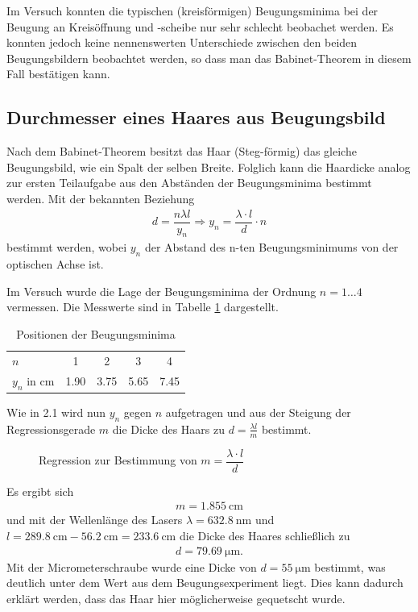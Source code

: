\documentclass[ngerman, parskip*]{scrartcl}
\begin{document}
Im Versuch konnten die typischen (kreisförmigen) Beugungsminima bei der Beugung an Kreisöffnung und -scheibe nur sehr schlecht beobachet werden. Es konnten jedoch keine nennenswerten Unterschiede zwischen den beiden Beugungsbildern beobachtet werden, so dass man das Babinet-Theorem in diesem Fall bestätigen kann. 


\subsection{Durchmesser eines Haares aus Beugungsbild}

Nach dem Babinet-Theorem besitzt das Haar (Steg-förmig) das gleiche Beugungsbild, wie ein Spalt der selben Breite. Folglich kann die Haardicke analog zur ersten Teilaufgabe aus den Abständen der Beugungsminima bestimmt werden. Mit der bekannten Beziehung
\begin{align*}
  d = \dfrac{n\lambda l}{y_n} \Rightarrow y_n = \dfrac{\lambda \cdot l}{d}\cdot n
\end{align*}
bestimmt werden, wobei $y_n$ der Abstand des n-ten Beugungsminimums von der optischen Achse ist. 

Im Versuch wurde die Lage der Beugungsminima der Ordnung $n=1\dots 4$ vermessen. Die Messwerte sind in Tabelle \ref{table:2_4} dargestellt. 

\begin{table}[!h]
\centering
\caption{Positionen der Beugungsminima}
\begin{tabular}{l|cccc}
\toprule
$n$ & 1 & 2 & 3 & 4 \\ 
$y_n$ in $\si{\cm}$ & 1.90 & 3.75 & 5.65 & 7.45 \\ 
\bottomrule
\end{tabular}
\label{table:2_4}
\end{table}

Wie in 2.1 wird nun $y_n$ gegen $n$ aufgetragen und aus der Steigung der Regressionsgerade $m$ die Dicke des Haars zu $d = \frac{\lambda l}{m}$ bestimmt.

\begin{figure}
  \centering
  \caption{Regression zur Bestimmung von $m = \dfrac{\lambda \cdot l}{d}$ }
  
\end{figure}

Es ergibt sich 
\begin{align*}
  m = \SI {1,855}{\cm}
\end{align*}
und mit der Wellenlänge des Lasers $\lambda = \SI{632,8}{\nano\meter}$ und $l = \SI{289,8}{\cm} - \SI{56,2}{\cm} = \SI{233,6}{\cm}$ die Dicke des Haares schließlich zu
\begin{align*}
  d = \SI{79,69}{\micro\meter}.
\end{align*}
Mit der Micrometerschraube wurde eine Dicke von $d = \SI{55}{\micro\meter}$ bestimmt, was deutlich unter dem Wert aus dem Beugungsexperiment liegt. Dies kann dadurch erklärt werden, dass das Haar hier möglicherweise gequetscht wurde. 
\end{document}
